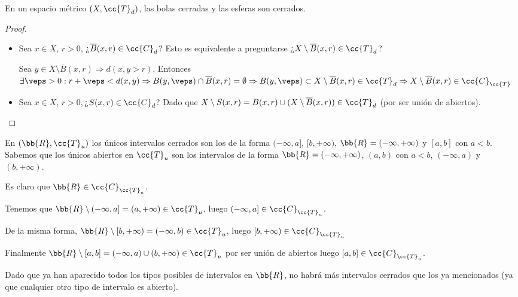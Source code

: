 \begin{ejemplo} En un espacio métrico $(X, \cc{T}_d)$, las bolas cerradas y las esferas son cerrados.
    \begin{proof}\
        \begin{itemize}
            \item Sea $x\in X$, $r>0$, ¿$\overline{B}(x,r)\in \cc{C}_d$? Esto es equivalente a preguntarse ¿$X\setminus \overline{B}(x,r) \in \cc{T}_d$?
            
            Sea $y \in X\setminus\overline{B}(x,r) \Rightarrow d(x,y>r)$. Entonces $\exists \veps >0 : r+\veps < d(x,y)\Rightarrow B(y,\veps)\cap \overline{B}(x,r)=\emptyset \Rightarrow B(y,\veps)\subset X\setminus \overline{B}(x,r)\in \cc{T}_d \Rightarrow X\setminus \overline{B}(x,r)\in \cc{C}_{\cc{T}}$

            \item Sea $x\in X$, $r>0, $¿$S(x,r)\in \cc{C}_d$? Dado que $X\setminus S(x,r)=B(x,r)\cup (X\setminus \overline{B}(x,r))\in \cc{T}_d$ (por ser unión de abiertos).
        \end{itemize}
    \end{proof}
\end{ejemplo}

\begin{ejercicio}
    En $(\bb{R},\cc{T}_u)$ los únicos intervalos cerrados son los de la forma $(-\infty, a]$, $[b, +\infty)$, $\bb{R}=(-\infty, +\infty)$ y $[a,b]$ con $a<b$.\\

    Sabemos que los únicos abiertos en $\cc{T}_u$ son los intervalos de la forma $\bb{R}=(-\infty, +\infty)$, $(a,b)$ con $a<b$, $(-\infty, a)$ y $(b, +\infty)$.

    Es claro que $\bb{R}\in \cc{C}_{\cc{T}_u}$. 
    
    Tenemos que $\bb{R}\setminus(-\infty,a] = (a,+\infty)\in \cc{T}_u$, luego $(-\infty,a]\in \cc{C}_{\cc{T}_u}$. 
    
    De la misma forma, $\bb{R}\setminus[b,+\infty) = (-\infty,b)\in \cc{T}_u$, luego $[b,+\infty)\in \cc{C}_{\cc{T}_u}$

    Finalmente $\bb{R}\setminus [a,b]=(-\infty,a)\cup(b,+\infty)\in \cc{T}_u$ por ser unión de abiertos luego $[a,b]\in \cc{C}_{\cc{T}_u}$.

    Dado que ya han aparecido todos los tipos posibles de intervalos en $\bb{R}$, no habrá más intervalos cerrados que los ya mencionados (ya que cualquier otro tipo de intervalo es abierto).

    \endsquare
\end{ejercicio}

